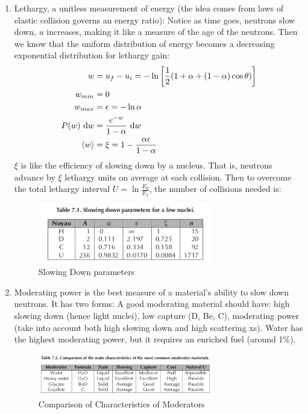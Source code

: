 \documentclass{school-22.211-notes}
\begin{document}
\begin{enumerate}
\item Lethargy, a unitless measurement of energy (the idea comes from laws of elastic collision governs an energy ratio):
Notice as time goes, neutrons slow down, $u$ increases, making it like a measure of the age of the neutrons. Then we know that the uniform distribution of energy becomes a decreasing exponential distribution for lethargy gain: 
\begin{align}
w &= u_f - u_i = -\ln \left[ \frac{1}{2} ( 1 + \alpha + (1-\alpha) \cos \theta ) \right] \\
w_{min} &= 0 \\
w_{max} &= \epsilon = -\ln \alpha \\
P(w) \mbox{ }\mathrm{d} w &= \frac{e^{-w}}{1 - \alpha} \mbox{ }\mathrm{d} w \\
\left< w \right> &= \xi = 1 - \frac{\alpha \epsilon}{1 - \alpha} 
\end{align}
$\xi$ is like the efficiency of slowing down by a nucleus. That is, neutrons advance by $\xi$ lethargy units on average at each collision. Then to overcome the total lethargy interval $U = \ln \frac{E_0}{E_1}$, the number of collisions needed is:
\begin{figure}
  \centering
  \includegraphics[width=3in]{images/sl-d/slowing-down-parameter.png}
  \caption{Slowing Down parameters}
\end{figure}

\item Moderating power is the best measure of a material's ability to slow down neutrons. It has two forms:
A good moderating material should have: high slowing down (hence light nuclei), low capture (D, Be, C), moderating power (take into account both high slowing down and high scattering xs). Water has the highest moderating power, but it requires an enriched fuel (around 1\%). 
\begin{figure}
  \centering
  \includegraphics[width=3in]{images/sl-d/moderator-comparison.png}
  \caption{Comparison of Characteristics of Moderators}
\end{figure}


\end{enumerate}
\end{document}
